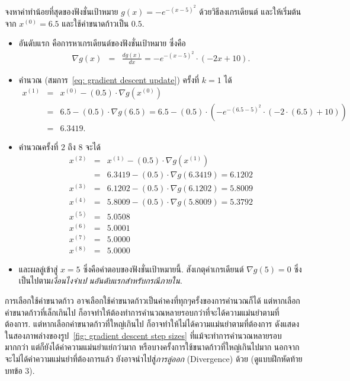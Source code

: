 \begin{myexample}
จงหาค่าทำน้อยที่สุดของฟังชั่นเป้าหมาย $g(x) = - e^{ - (x-5)^2 }$ ด้วยวิธีลงเกรเดียนต์ 
และให้เริ่มต้นจาก $x^{(0)} = 6.5$ และใช้ค่าขนาดก้าวเป็น $0.5$.
\begin{itemize}
\item อันดับแรก คือการหาเกรเดียนต์ของฟังชั่นเป้าหมาย ซึ่งคือ 
\begin{eqnarray}
   \nabla g(x) &=& 
   \frac{d g(x)}{d x} = 
   - e^{ - (x-5)^2 } \cdot (-2 x + 10).
\nonumber   
\end{eqnarray}
\item คำนวณ (สมการ~\ref{eq: gradient descent update}) ครั้งที่ $k=1$ ได้
\begin{eqnarray}
   x^{(1)} &=& x^{(0)} - (0.5) \cdot \nabla g (x^{(0)})
\nonumber \\
   &=& 6.5 - (0.5) \cdot \nabla g (6.5)  
   = 6.5 - (0.5) \cdot \left(- e^{ - (6.5-5)^2 } \cdot (-2 \cdot (6.5) + 10) \right) 
\nonumber \\   
   &=& 6.3419.
\nonumber   
\end{eqnarray}
\item คำนวณครั้งที่ $2$ ถึง $8$ จะได้
\begin{eqnarray}
   x^{(2)} &=& x^{(1)} - (0.5) \cdot \nabla g (x^{(1)})
\nonumber \\
   &=& 6.3419 - (0.5) \cdot \nabla g (6.3419) = 6.1202
\nonumber \\
   x^{(3)} &=& 6.1202 - (0.5) \cdot \nabla g (6.1202) = 5.8009
\nonumber \\
   x^{(4)} &=& 5.8009 - (0.5) \cdot \nabla g (5.8009) = 5.3792
\nonumber \\
   x^{(5)} &=& 5.0508   
\nonumber \\   
   x^{(6)} &=& 5.0001   
\nonumber \\   
   x^{(7)} &=& 5.0000   
\nonumber \\   
   x^{(8)} &=& 5.0000   
\nonumber
\end{eqnarray}

\item และผลลู่เข้าสู่ $x = 5$ ซึ่งคือคำตอบของฟังชั่นเป้าหมายนี้.
สังเกตุค่าเกรเดียนต์ $\nabla g(5) = 0$ ซึ่งเป็นไปตาม\textit{เงื่อนไงจำเปนอันดับแรกสำหรับกรณีภายใน}.
\end{itemize}

\end{myexample}


การเลือกใช้ค่าขนาดก้าว อาจเลือกใช้ค่าขนาดก้าวเป็นค่าคงที่ทุกๆครั้งของการคำนวณก็ได้ 
แต่หากเลือกค่าขนาดก้าวที่เล็กเกินไป ก็อาจทำให้ต้องทำการคำนวณหลายรอบกว่าที่จะได้ความแม่นยำตามที่ต้องการ.
แต่หากเลือกค่าขนาดก้าวที่ใหญ่เกินไป ก็อาจทำให้ไม่ได้ความแม่นยำตามที่ต้องการ ดังแสดงในสองภาพล่างของรูป~\ref{fig: gradient descent step sizes}
ที่แม้จะทำการคำนวณหลายรอบมากกว่า แต่ก็ยังได้ค่าความแม่นยำแย่กว่ามาก
หรือบางครั้งการใช้ขนาดก้าวที่ใหญ่เกินไปมาก นอกจากจะไม่ได้ค่าความแม่นยำที่ต้องการแล้ว ยังอาจนำไปสู่\textit{การลู่ออก} (Divergence) ด้วย (ดูแบบฝึกหัดท้ายบทข้อ 3).

